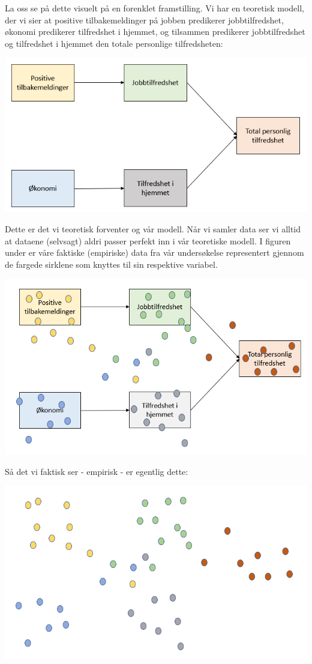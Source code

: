 \documentclass[
]{article}
\begin{document}
La oss se på dette visuelt på en forenklet framstilling. Vi har en teoretisk modell, der vi sier at positive tilbakemeldinger på jobben predikerer jobbtilfredshet, økonomi predikerer tilfredshet i hjemmet, og tilsammen predikerer jobbtilfredshet og tilfredshet i hjemmet den totale personlige tilfredsheten:

\includegraphics{faktoranalyse2.png}

Dette er det vi teoretisk forventer og vår modell. Når vi samler data ser vi alltid at dataene (selvsagt) aldri passer perfekt inn i vår teoretiske modell. I figuren under er våre faktiske (empiriske) data fra vår undersøkelse representert gjennom de fargede sirklene som knyttes til sin respektive variabel.

\includegraphics{faktoranalyse3.png}

Så det vi faktisk ser - empirisk - er egentlig dette:

\includegraphics{faktoranalyse4.png}
\end{document}
